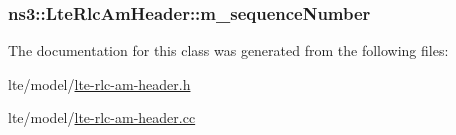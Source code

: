 \subsubsection[{\texorpdfstring{m\+\_\+sequence\+Number}{m_sequenceNumber}}]{ ns3\+::\+Lte\+Rlc\+Am\+Header\+::m\+\_\+sequence\+Number\hspace{0.3cm}{\ttfamily [private]}}\hypertarget{classns3_1_1LteRlcAmHeader_a524ef81f1d7f15e1b19f6487c1d11921}{}\label{classns3_1_1LteRlcAmHeader_a524ef81f1d7f15e1b19f6487c1d11921}


The documentation for this class was generated from the following files\+:\begin{DoxyCompactItemize}
\item 
lte/model/\hyperlink{lte-rlc-am-header_8h}{lte-\/rlc-\/am-\/header.\+h}\item 
lte/model/\hyperlink{lte-rlc-am-header_8cc}{lte-\/rlc-\/am-\/header.\+cc}\end{DoxyCompactItemize}
